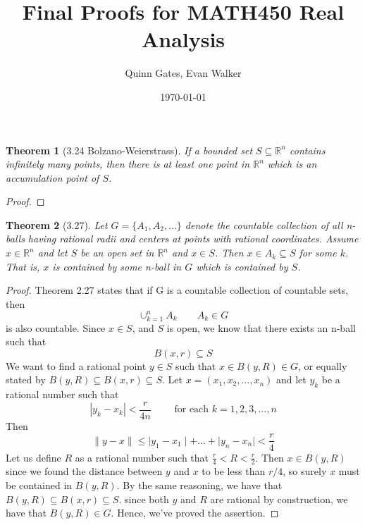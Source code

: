\documentclass[aps,pra,notitlepage,amsmath,amssymb,letterpaper,12pt]{revtex4-1}
\newtheorem{theorem}{Theorem}
\begin{document}
\title{Final Proofs for MATH450 Real Analysis}
\author{Quinn Gates, Evan Walker}
\date{\today}

\maketitle


\begin{theorem}[3.24 Bolzano-Weierstrass]
If a bounded set $S \subseteq \mathbb{R}^n$ contains infinitely many points, then there is at least one point in $\mathbb{R}^n$ which is an accumulation point of $S$.
\end{theorem}

\begin{proof}
\end{proof}


\begin{theorem}[3.27] \nonumber
Let $G = \{A_{1},A_{2},...\}$ denote the countable collection of all n-balls having rational radii and centers at points with rational coordinates. Assume $x \in \mathbb{R}^n$ and let $S$ be an open set in $\mathbb{R}^n$ and $x \in S$. Then $x \in A_{k} \subseteq S$ for some $k$. That is, $x$ is contained by some n-ball in $G$ which is contained by $S$.
\end{theorem}
\begin{proof}
Theorem 2.27 states that if G is a countable collection of countable sets, then
\[\cup_{k=1}^{n} A_{k} \qquad A_{k} \in G\]
is also countable. Since $x \in S$, and $S$ is open, we know that there exists an n-ball such that
\[B(x,r) \subseteq S\]
We want to find a rational point $y\in S$ such that $x \in B(y,R) \in G$, or equally stated by $B(y,R) \subseteq B(x,r) \subseteq S$. Let
$x=(x_{1},x_{2},...,x_{n})$ and let $y_{k}$ be a rational number such that
\[\left| y_{k} - x_{k} \right| < \frac{r}{4n} \qquad \textrm{ for each } k=1,2,3,...,n\]
Then
\[\|y-x\| \leq \mid y_{1}-x_{1} \mid + ... + \mid y_{n}-x_{n} \mid < \frac{r}{4}\]
Let us define $R$ as a rational number such that $\frac{r}{4} < R < \frac{r}{2}$. Then
$x \in B(y,R)$ since we found the distance between $y$ and $x$ to be less than $r/4$, so surely $x$ must be contained in $B(y,R)$. By the same reasoning, we have that $B(y,R) \subseteq B(x,r) \subseteq S$. since both $y$ and $R$ are rational by construction, we have that $B(y,R) \in G$. Hence, we've proved the assertion.
\end{proof}
\end{document}
